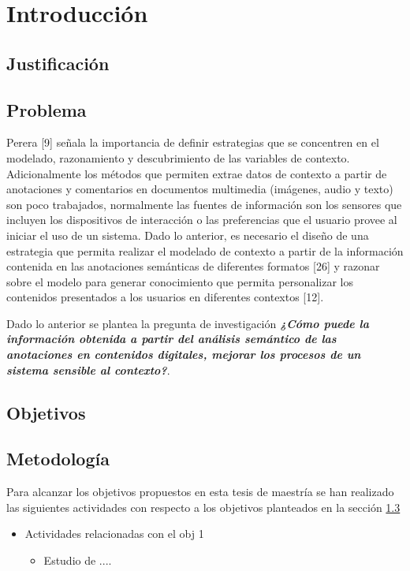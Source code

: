 \chapter{Introducci\'{o}n}
\label{chp:Introduccion}

\section{Justificación}
\label{sec:Justificacion}

\section{Problema}
\label{sec:Problema}

Perera [9] señala la importancia de definir estrategias que se concentren en el modelado, razonamiento y descubrimiento de las variables de contexto. Adicionalmente los métodos que permiten extrae datos de contexto a partir de anotaciones y comentarios en documentos multimedia (imágenes, audio y texto) son poco trabajados, normalmente las fuentes de información son los sensores que incluyen los dispositivos de interacción o las preferencias que el usuario provee al iniciar el uso de un sistema.
Dado lo anterior, es necesario el diseño de una estrategia que permita realizar el modelado de contexto a partir de la información contenida en las anotaciones semánticas de diferentes formatos [26] y razonar sobre el modelo para generar conocimiento que permita personalizar los contenidos presentados a los usuarios en diferentes contextos [12].

Dado lo anterior se plantea la pregunta de investigación \textit{\textbf{¿Cómo puede la información obtenida a partir del análisis semántico de las anotaciones en contenidos digitales, mejorar los procesos de un sistema sensible al contexto?}}.

\section{Objetivos}
\label{sec:Int_Objetivos}

\section{Metodología}
\label{sec:Int_Metodologia}

Para alcanzar los objetivos propuestos en esta tesis de maestría se han realizado las siguientes actividades con respecto a los objetivos planteados en la sección \ref{sec:Int_Objetivos}
\begin{itemize}
    \item Actividades relacionadas con el obj 1
    \begin{itemize}
        \item Estudio de ....
    \end{itemize}
\end{itemize}
